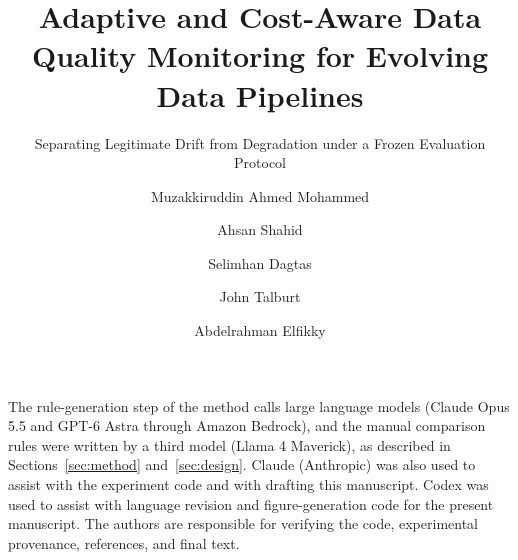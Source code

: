 \documentclass[manuscript,screen,review]{acmart}
\begin{document}
\title{Adaptive and Cost-Aware Data Quality Monitoring for Evolving Data Pipelines}
\subtitle{Separating Legitimate Drift from Degradation under a Frozen Evaluation Protocol}

\author{Muzakkiruddin Ahmed Mohammed}

\author{Ahsan Shahid}
\authornotemark[2]

\author{Selimhan Dagtas}

\author{John Talburt}

\author{Abdelrahman Elfikky}

\renewcommand{\shortauthors}{Mohammed et al.}





\maketitle










\begin{acks}
The rule-generation step of the method calls large language models (Claude Opus 5.5 and GPT-6 Astra through Amazon Bedrock), and the manual comparison rules were written by a third model (Llama 4 Maverick), as described in Sections~\ref{sec:method} and~\ref{sec:design}. Claude (Anthropic) was also used to assist with the experiment code and with drafting this manuscript. Codex was used to assist with language revision and figure-generation code for the present manuscript. The authors are responsible for verifying the code, experimental provenance, references, and final text.
\end{acks}



\end{document}
